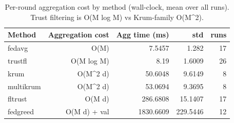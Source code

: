 \begin{table}[t]
\centering
\caption{Per-round aggregation cost by method (wall-clock, mean over all runs). Trust filtering is O(M log M) vs Krum-family O(M^2).}
\label{tab:cost}
\begin{tabular}{lrrrr}
\toprule
Method & Aggregation cost & Agg time (ms) & std & runs \\
\midrule
fedavg & O(M) & 7.5457 & 1.282 & 17 \\
trustfl & O(M log M) & 8.19 & 1.6009 & 26 \\
krum & O(M^2 d) & 50.6048 & 9.6149 & 8 \\
multikrum & O(M^2 d) & 53.0694 & 9.3695 & 8 \\
fltrust & O(M d) & 286.6808 & 15.1407 & 17 \\
fedgreed & O(M d) + val & 1830.6609 & 229.5446 & 12 \\
\bottomrule
\end{tabular}
\end{table}
